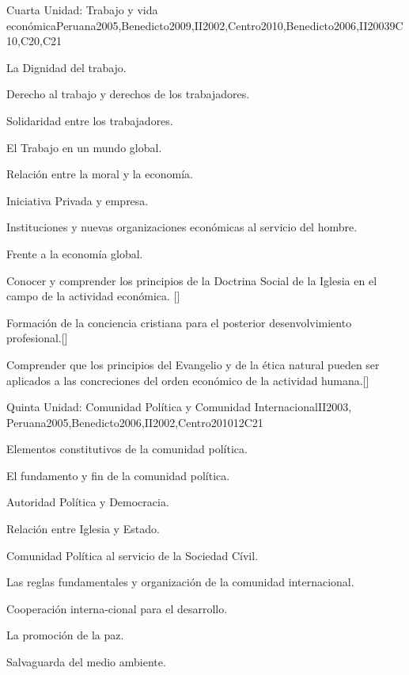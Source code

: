 \begin{syllabus}
\begin{unit}{}{Cuarta Unidad: Trabajo y vida económica}{Peruana2005,Benedicto2009,II2002,Centro2010,Benedicto2006,II2003}{9}{C10,C20,C21}
\begin{topics}
	\item La Dignidad del trabajo.
	\item Derecho al trabajo y derechos de los trabajadores.
	\item Solidaridad entre los trabajadores.
	\item El Trabajo en un mundo global.
	\item Relación entre la moral y la economía.
	\item Iniciativa Privada y empresa.
	\item Instituciones y nuevas organizaciones económicas al servicio del hombre.
	\item Frente a la economía global.
\end{topics}
\begin{learningoutcomes}
	\item Conocer y comprender los principios de la Doctrina Social de la Iglesia en el campo de la actividad económica. [\Familiarity]
	\item Formación de la conciencia cristiana para el posterior desenvolvimiento profesional.[\Usage]
	\item Comprender que los principios del Evangelio y de la ética natural pueden ser aplicados  a las concreciones del orden económico de la actividad humana.[\Familiarity]
\end{learningoutcomes}
\end{unit}

\begin{unit}{}{Quinta Unidad: Comunidad Política y Comunidad Internacional}{II2003, Peruana2005,Benedicto2006,II2002,Centro2010}{12}{C21}
\begin{topics}
	\item Elementos constitutivos de la comunidad política.
	\item El fundamento y fin de la comunidad política.
	\item Autoridad Política y Democracia.
	\item Relación entre Iglesia y Estado.
	\item Comunidad Política al servicio de la Sociedad Cívil.
	\item Las reglas fundamentales y organización de la comunidad internacional.
	\item Cooperación interna-cional para el desarrollo.
	\item La promoción de la paz.
	\item Salvaguarda del medio ambiente.


\end{topics}
\end{unit}
\end{syllabus}
